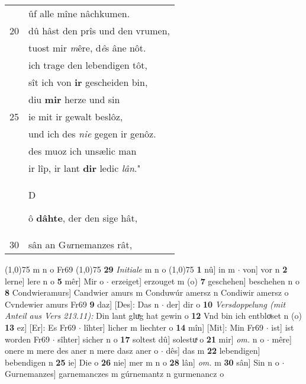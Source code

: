 \documentclass[8pt,a4paper,notitlepage]{article}
\begin{document}
\begin{table}[ht]
\begin{minipage}[t]{0.5\linewidth}
\begin{tabular}{rl}
 & ûf alle mîne nâchkumen.\\ 
20 & dû hâst den prîs und den vrumen,\\ 
 & tuost mir \textit{m}êre, d\textit{ê}s âne nôt.\\ 
 & ich trage den lebendigen tôt,\\ 
 & sît ich von \textbf{ir} gescheiden bin,\\ 
 & diu \textbf{mir} herze und sin\\ 
25 & ie mit ir gewalt beslôz,\\ 
 & und ich des \textit{nie} gegen ir genôz.\\ 
 & des muoz ich unsælic man\\ 
 & ir lîp, ir lant \textbf{dir} ledic \textit{lân}."\\ 
 & \begin{large}D\end{large}ô \textbf{dâhte}, der den sige hât,\\ 
30 & sân an G\textit{u}rnemanzes rât,\\ 
\end{tabular}
\scriptsize
\line(1,0){75} \newline
m n o Fr69 \newline
\line(1,0){75} \newline
\textbf{29} \textit{Initiale} m n o  \newline
\line(1,0){75} \newline
\textbf{1} nû] in m  $\cdot$ von] vor n \textbf{2} lerne] lere n o \textbf{5} mêr] Mir o  $\cdot$ erzeiget] erzouget m (o) \textbf{7} geschehen] beschehen n o \textbf{8} Condwieramurs] Candwier amurs m Conduwúr amersz n Condiwir amersz o Cvndewier amurs Fr69 \textbf{9} daz] [Des]: Das n  $\cdot$ der] dir o \textbf{10} \textit{Versdoppelung (mit Anteil aus Vers 213.11):} Din lant gluͯg hat gewin o  \textbf{12} Vnd bin ich entbloͯset n (o) \textbf{13} ez] [Er]: Es Fr69  $\cdot$ lîhter] licher m liechter o \textbf{14} mîn] [Mit]: Min Fr69  $\cdot$ ist] ist worden Fr69  $\cdot$ sîhter] sicher n o \textbf{17} soltest dû] solestuͯ o \textbf{21} mir] \textit{om.} n o  $\cdot$ mêre] onere m mere des aner n mere dasz aner o  $\cdot$ dês] das m \textbf{22} lebendigen] bebendigen n \textbf{25} ie] Die o \textbf{26} nie] mer m n o \textbf{28} lân] \textit{om.} m \textbf{30} sân] Sin n o  $\cdot$ Gurnemanzes] garnemanczes m gúrnemantz n gurmenancz o \newline
\end{minipage}
\end{table}
\newpage
\end{document}
